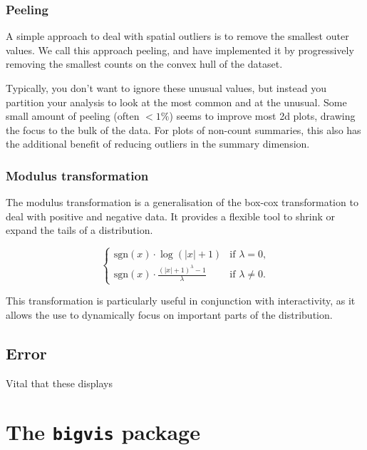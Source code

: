 \documentclass[journal]{vgtc}                %
\begin{document}
\subsubsection{Peeling}

A simple approach to deal with spatial outliers is to remove the smallest outer values. We call this approach peeling, and have implemented it by progressively removing the smallest counts on the convex hull of the dataset.

Typically, you don't want to ignore these unusual values, but instead you partition your analysis to look at the most common and at the unusual. Some small amount of peeling (often $< 1\%$) seems to improve most 2d plots, drawing the focus to the bulk of the data.  For plots of non-count summaries, this also has the additional benefit of reducing outliers in the summary dimension. 

\subsubsection{Modulus transformation}

The modulus transformation \citep{john:1980} is a generalisation of the box-cox transformation \citep{box:1964} to deal with positive and negative data. It provides a flexible tool to shrink or expand the tails of a distribution.

\begin{equation}
\begin{cases} 
  \text{sgn}(x) \cdot \log(|x| + 1) & \text{if $\lambda = 0$,} \\
  \text{sgn}(x) \cdot \frac{(|x| + 1)^\lambda - 1}{\lambda} &\text{if $\lambda \ne 0$.}
\end{cases}
\end{equation}

This transformation is particularly useful in conjunction with interactivity, as it allows the use to dynamically focus on important parts of the distribution.

\subsection{Error}

Vital that these displays

\section{The {\tt bigvis} package}
\label{sec:bigvis}
\end{document}
